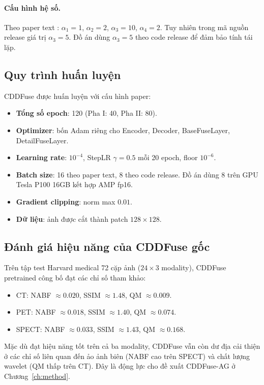 \paragraph{Cấu hình hệ số.}
Theo paper text \cite{zhao2023cddfuse}: $\alpha_1 = 1$, $\alpha_2 = 2$, $\alpha_3 = 10$, $\alpha_4 = 2$. Tuy nhiên trong mã nguồn release giá trị $\alpha_3 = 5$. Đồ án dùng $\alpha_3 = 5$ theo code release để đảm bảo tính tái lặp.

\subsection{Quy trình huấn luyện}
\label{ssec:cddfuse-train}

CDDFuse được huấn luyện với cấu hình paper:
\begin{itemize}\itemsep0pt
    \item \textbf{Tổng số epoch}: 120 (Pha I: 40, Pha II: 80).
    \item \textbf{Optimizer}: bốn Adam riêng cho Encoder, Decoder, BaseFuseLayer, DetailFuseLayer.
    \item \textbf{Learning rate}: $10^{-4}$, StepLR $\gamma = 0.5$ mỗi 20 epoch, floor $10^{-6}$.
    \item \textbf{Batch size}: 16 theo paper text, 8 theo code release. Đồ án dùng 8 trên GPU Tesla P100 16GB kết hợp AMP fp16.
    \item \textbf{Gradient clipping}: norm max $0.01$.
    \item \textbf{Dữ liệu}: ảnh được cắt thành patch $128 \times 128$.
\end{itemize}

\subsection{Đánh giá hiệu năng của CDDFuse gốc}
\label{ssec:cddfuse-eval}

Trên tập test Harvard medical 72 cặp ảnh ($24 \times 3$ modality), CDDFuse pretrained công bố đạt các chỉ số tham khảo:
\begin{itemize}\itemsep0pt
    \item CT: NABF $\approx 0.020$, SSIM $\approx 1.48$, QM $\approx 0.009$.
    \item PET: NABF $\approx 0.018$, SSIM $\approx 1.40$, QM $\approx 0.074$.
    \item SPECT: NABF $\approx 0.033$, SSIM $\approx 1.43$, QM $\approx 0.168$.
\end{itemize}
Mặc dù đạt hiệu năng tốt trên cả ba modality, CDDFuse vẫn còn dư địa cải thiện ở các chỉ số liên quan đến ảo ảnh biên (NABF cao trên SPECT) và chất lượng wavelet (QM thấp trên CT). Đây là động lực cho đề xuất CDDFuse-AG ở Chương~\ref{ch:method}.


